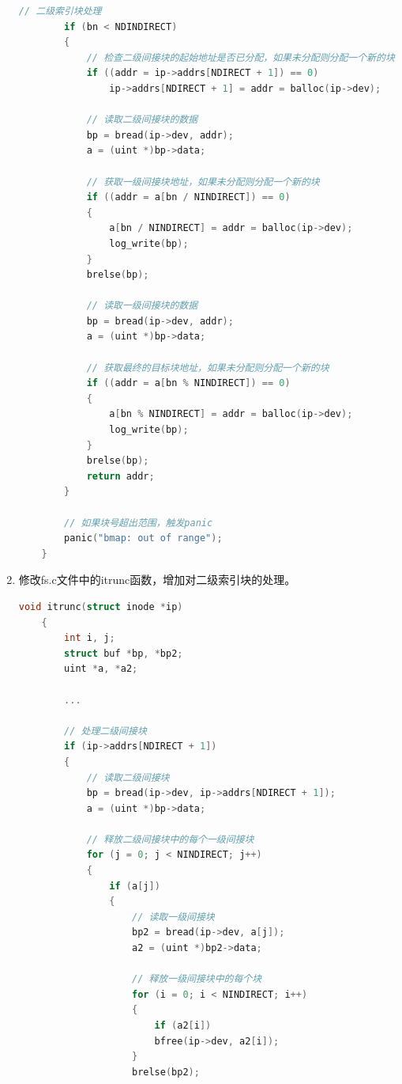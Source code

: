 \begin{enumerate}
\begin{lstlisting}[language=c,title=对bmap函数的修改]
        // 二级索引块处理
        if (bn < NDINDIRECT)
        {
            // 检查二级间接块的起始地址是否已分配，如果未分配则分配一个新的块
            if ((addr = ip->addrs[NDIRECT + 1]) == 0)
                ip->addrs[NDIRECT + 1] = addr = balloc(ip->dev);
        
            // 读取二级间接块的数据
            bp = bread(ip->dev, addr);
            a = (uint *)bp->data;
        
            // 获取一级间接块地址，如果未分配则分配一个新的块
            if ((addr = a[bn / NINDIRECT]) == 0)
            {
                a[bn / NINDIRECT] = addr = balloc(ip->dev);
                log_write(bp);
            }
            brelse(bp);
        
            // 读取一级间接块的数据
            bp = bread(ip->dev, addr);
            a = (uint *)bp->data;
        
            // 获取最终的目标块地址，如果未分配则分配一个新的块
            if ((addr = a[bn % NINDIRECT]) == 0)
            {
                a[bn % NINDIRECT] = addr = balloc(ip->dev);
                log_write(bp);
            }
            brelse(bp);
            return addr;
        }
    
        // 如果块号超出范围，触发panic
        panic("bmap: out of range");
    }    
    \end{lstlisting}
    \item 修改fs.c文件中的itrunc函数，增加对二级索引块的处理。
          \begin{lstlisting}[language=c,title=对itrunc函数的修改]
    void itrunc(struct inode *ip)
    {
        int i, j;
        struct buf *bp, *bp2;
        uint *a, *a2;
    
        ...
    
        // 处理二级间接块
        if (ip->addrs[NDIRECT + 1])
        {
            // 读取二级间接块
            bp = bread(ip->dev, ip->addrs[NDIRECT + 1]);
            a = (uint *)bp->data;
        
            // 释放二级间接块中的每个一级间接块
            for (j = 0; j < NINDIRECT; j++)
            {
                if (a[j])
                {
                    // 读取一级间接块
                    bp2 = bread(ip->dev, a[j]);
                    a2 = (uint *)bp2->data;
            
                    // 释放一级间接块中的每个块
                    for (i = 0; i < NINDIRECT; i++)
                    {
                        if (a2[i])
                        bfree(ip->dev, a2[i]);
                    }
                    brelse(bp2);
            

\end{lstlisting}
\end{enumerate}
